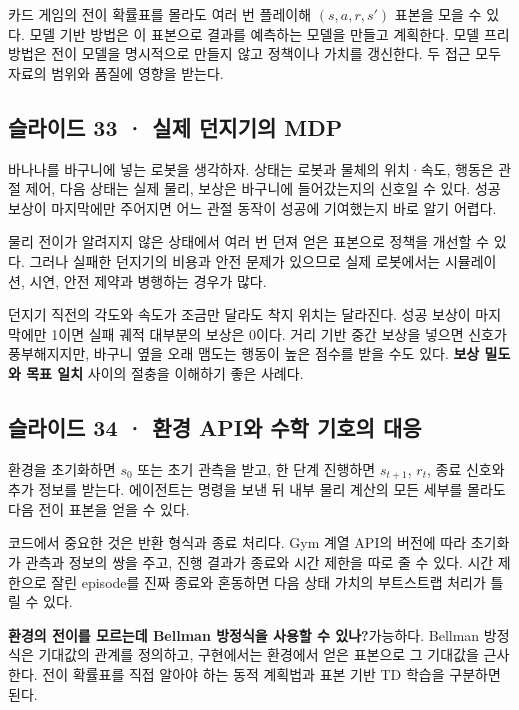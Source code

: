 \documentclass[11pt,a4paper]{article}
\begin{document}
카드 게임의 전이 확률표를 몰라도 여러 번 플레이해 $(s,a,r,s')$ 표본을 모을 수 있다. 모델 기반 방법은 이 표본으로 결과를 예측하는 모델을 만들고 계획한다. 모델 프리 방법은 전이 모델을 명시적으로 만들지 않고 정책이나 가치를 갱신한다. 두 접근 모두 자료의 범위와 품질에 영향을 받는다.\par

\subsection{슬라이드 33 · 실제 던지기의 MDP}

바나나를 바구니에 넣는 로봇을 생각하자. 상태는 로봇과 물체의 위치·속도, 행동은 관절 제어, 다음 상태는 실제 물리, 보상은 바구니에 들어갔는지의 신호일 수 있다. 성공 보상이 마지막에만 주어지면 어느 관절 동작이 성공에 기여했는지 바로 알기 어렵다.\par

물리 전이가 알려지지 않은 상태에서 여러 번 던져 얻은 표본으로 정책을 개선할 수 있다. 그러나 실패한 던지기의 비용과 안전 문제가 있으므로 실제 로봇에서는 시뮬레이션, 시연, 안전 제약과 병행하는 경우가 많다.\par

던지기 직전의 각도와 속도가 조금만 달라도 착지 위치는 달라진다. 성공 보상이 마지막에만 1이면 실패 궤적 대부분의 보상은 0이다. 거리 기반 중간 보상을 넣으면 신호가 풍부해지지만, 바구니 옆을 오래 맴도는 행동이 높은 점수를 받을 수도 있다. \textbf{보상 밀도와 목표 일치} 사이의 절충을 이해하기 좋은 사례다.\par

\subsection{슬라이드 34 · 환경 API와 수학 기호의 대응}

환경을 초기화하면 $s_0$ 또는 초기 관측을 받고, 한 단계 진행하면 $s_{t+1}$, $r_t$, 종료 신호와 추가 정보를 받는다. 에이전트는 명령을 보낸 뒤 내부 물리 계산의 모든 세부를 몰라도 다음 전이 표본을 얻을 수 있다.\par

코드에서 중요한 것은 반환 형식과 종료 처리다. Gym 계열 API의 버전에 따라 초기화가 관측과 정보의 쌍을 주고, 진행 결과가 종료와 시간 제한을 따로 줄 수 있다. 시간 제한으로 잘린 episode를 진짜 종료와 혼동하면 다음 상태 가치의 부트스트랩 처리가 틀릴 수 있다.\par

\par\medskip\noindent\textbf{환경의 전이를 모르는데 Bellman 방정식을 사용할 수 있나?}\quad 가능하다. Bellman 방정식은 기대값의 관계를 정의하고, 구현에서는 환경에서 얻은 표본으로 그 기대값을 근사한다. 전이 확률표를 직접 알아야 하는 동적 계획법과 표본 기반 TD 학습을 구분하면 된다.\par
\end{document}
